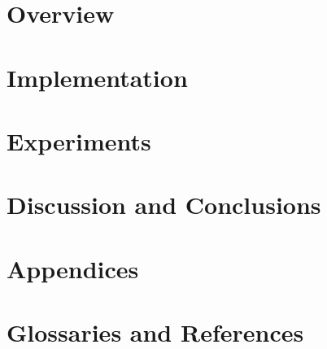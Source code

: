\documentclass[\mytextsize, a4paper, twoside, openany, draft]{memoir}
\begin{document}
\frontmatter


\mainmatter
\part{Overview}
\label{pt:overview}



\part{Implementation}
\label{pt:implementation}


\part{Experiments}
\label{pt:experiments}

\label{pt:results}


\part{Discussion and Conclusions}


\part{Appendices}
\label{pt:appendices}


\part{Glossaries and References}
\label{pt:backmatter}
\backmatter

\end{document}

